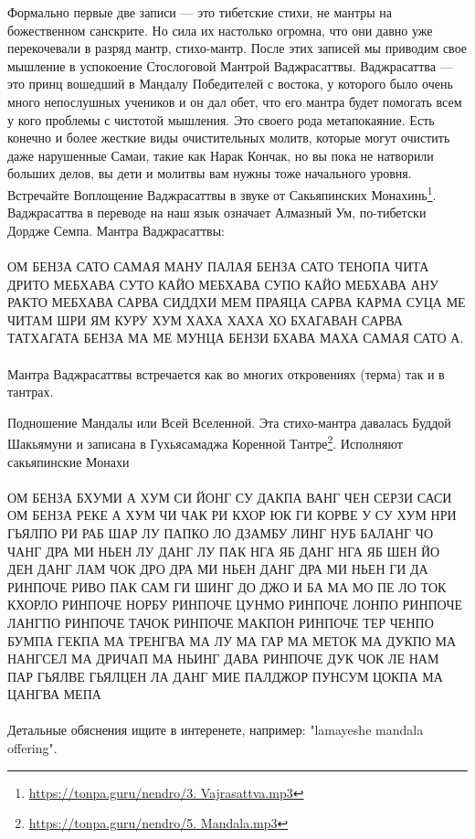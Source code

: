 Формально первые две записи — это тибетские стихи, не мантры
на божественном санскрите. Но сила их настолько огромна, что
они давно уже перекочевали в разряд мантр, стихо-мантр. После
этих записей мы приводим свое мышление в успокоение Стослоговой
Мантрой Ваджрасаттвы. Ваджрасаттва — это принц вошедший в Мандалу
Победителей с востока, у которого было очень много непослушных
учеников и он дал обет, что его мантра будет помогать всем у кого
проблемы с чистотой мышления. Это своего рода метапокаяние. Есть
конечно и более жесткие виды очистительных молитв, которые могут
очистить даже нарушенные Самаи, такие как Нарак Кончак, но вы пока
не натворили больших делов, вы дети и молитвы вам нужны тоже начального
уровня. Встречайте Воплощение Ваджрасаттвы в звуке от
Сакьяпинских Монахинь\footnote{\url{https://tonpa.guru/nendro/3. Vajrasattva.mp3}}.
Ваджрасаттва в переводе на наш язык означает Алмазный Ум, по-тибетски
Дордже Семпа. Мантра Ваджрасаттвы:
\\
\\
ОМ БЕНЗА САТО САМАЯ МАНУ ПАЛАЯ БЕНЗА САТО ТЕНОПА ЧИТА ДРИТО
МЕБХАВА СУТО КАЙО МЕБХАВА СУПО КАЙО МЕБХАВА АНУ РАКТО МЕБХАВА
САРВА СИДДХИ МЕМ ПРАЯЦА САРВА КАРМА СУЦА МЕ ЧИТАМ ШРИ ЯМ КУРУ
ХУМ ХАХА ХАХА ХО БХАГАВАН САРВА ТАТХАГАТА БЕНЗА МА МЕ МУНЦА
БЕНЗИ БХАВА МАХА САМАЯ САТО А.
\\
\\
Мантра Ваджрасаттвы встречается как во многих откровениях (терма) так и в тантрах.

Подношение Мандалы или Всей Вселенной. Эта стихо-мантра давалась
Буддой Шакьямуни и записана в Гухьясамаджа Коренной
Тантре\footnote{\url{https://tonpa.guru/nendro/5. Mandala.mp3}}.
Исполняют сакьяпинские Монахи
\\
\\
ОМ БЕНЗА БХУМИ А ХУМ СИ ЙОНГ СУ ДАКПА ВАНГ ЧЕН СЕРЗИ
САСИ ОМ БЕНЗА РЕКЕ А ХУМ ЧИ ЧАК РИ КХОР ЮК ГИ КОРВЕ
У СУ ХУМ НРИ ГЬЯЛПО РИ РАБ ШАР ЛУ ПАПКО ЛО ДЗАМБУ
ЛИНГ НУБ БАЛАНГ ЧО ЧАНГ ДРА МИ НЬЕН ЛУ ДАНГ ЛУ ПАК
НГА ЯБ ДАНГ НГА ЯБ ШЕН ЙО ДЕН ДАНГ ЛАМ ЧОК ДРО ДРА
МИ НЬЕН ДАНГ ДРА МИ НЬЕН ГИ ДА РИНПОЧЕ РИВО ПАК САМ
ГИ ШИНГ ДО ДЖО И БА МА МО ПЕ ЛО ТОК КХОРЛО РИНПОЧЕ
НОРБУ РИНПОЧЕ ЦУНМО РИНПОЧЕ ЛОНПО РИНПОЧЕ ЛАНГПО
РИНПОЧЕ ТАЧОК РИНПОЧЕ МАКПОН РИНПОЧЕ ТЕР ЧЕНПО
БУМПА ГЕКПА МА ТРЕНГВА МА ЛУ МА ГАР МА МЕТОК МА
ДУКПО МА НАНГСЕЛ МА ДРИЧАП МА НЬИНГ ДАВА РИНПОЧЕ
ДУК ЧОК ЛЕ НАМ ПАР ГЬЯЛВЕ ГЬЯЛЦЕН ЛА ДАНГ МИЕ ПАЛДЖОР
ПУНСУМ ЦОКПА МА ЦАНГВА МЕПА
\\
\\
Детальные обяснения ищите в интеренете, например: "lamayeshe mandala offering".

